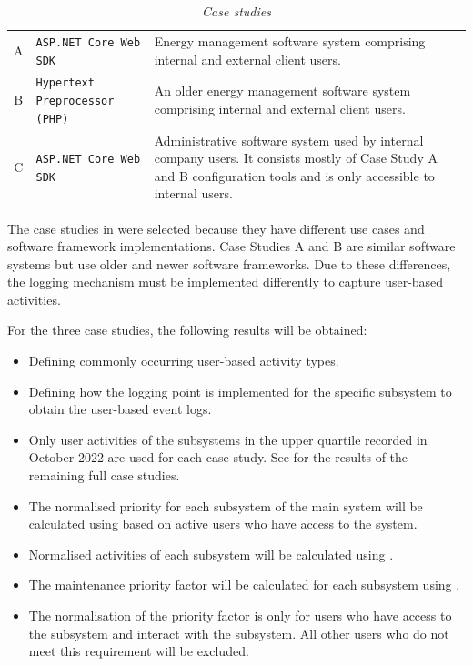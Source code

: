 \begin{table}[!htb]
	\centering
	\caption[Case studies]
	{\textit{Case studies}}
	\label{tbl:ch3_caseStudies}
	\begin{tabularx}{\textwidth}{clX}
		\toprule
		\thead{Case study} & \thead{Software framework} & \thead{Description} \\
		\midrule
		\rowcolor{lightgray}
		A & \texttt{ASP.NET Core Web SDK} & \RaggedRight Energy management software system comprising internal and external client users. \\
		B & \texttt{Hypertext Preprocessor (PHP)} & \RaggedRight An older energy management software system comprising internal and external client users. \\
		\rowcolor{lightgray}
		C & \texttt{ASP.NET Core Web SDK} & \RaggedRight Administrative software system used by internal company users. It consists mostly of Case Study A and B configuration tools and is only accessible to internal users. \\
		\bottomrule
	\end{tabularx}
\end{table}

The case studies in  were selected because they have different use cases and software framework implementations. Case Studies A and B are similar software systems but use older and newer software frameworks. Due to these differences, the logging mechanism must be implemented differently to capture user-based activities. \par For the three case studies, the following results will be obtained:

\begin{itemize}
\item Defining commonly occurring user-based activity types.
\item Defining how the logging point is implemented for the specific subsystem to obtain the user-based event logs.
\item Only user activities of the subsystems in the upper quartile recorded in October 2022 are used for each case study. See  for the results of the remaining full case studies.
\item The normalised priority for each subsystem of the main system will be calculated using  based on active users who have access to the system.
\item Normalised activities of each subsystem will be calculated using .
\item The maintenance priority factor will be calculated for each subsystem using .
\item The normalisation of the priority factor is only for users who have access to the subsystem and interact with the subsystem. All other users who do not meet this requirement will be excluded.
\end{itemize}

